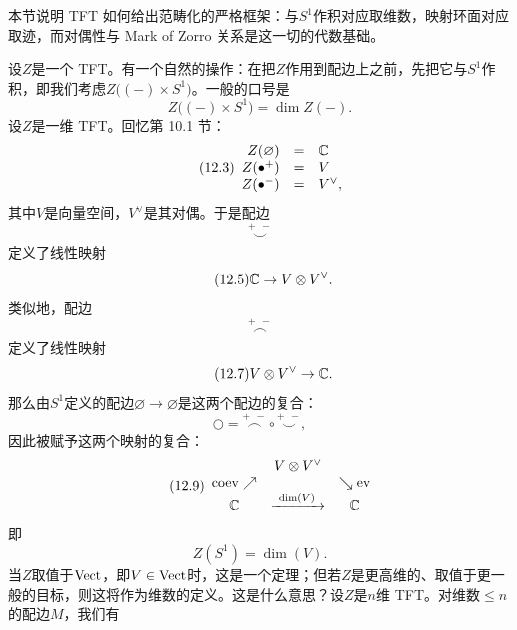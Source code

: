 \begin{sectionkey}
本节说明 TFT 如何给出范畴化的严格框架：与$S^{1}$作积对应取维数，映射环面对应取迹，而对偶性与 Mark of Zorro 关系是这一切的代数基础。
\end{sectionkey}

设$Z$是一个 TFT。有一个自然的操作：在把$Z$作用到配边上之前，先把它与$S^{1}$作积，即我们考虑$Z\bigl((-)\times S^{1}\bigr)$。一般的口号是
\begin{equation}\tag{12.2}
Z\bigl((-)\times S^{1}\bigr)=\dim Z(-).
\end{equation}
设$Z$是一维 TFT。回忆第 10.1 节：
\begin{equation}\tag{12.3}
\begin{array}{rcl}
Z(\varnothing)&=&\mathbb{C}\\
Z(\bullet^+)&=&V\\
Z(\bullet^-)&=&V^{\vee},
\end{array}
\end{equation}
其中$V$是向量空间，$V^{\vee}$是其对偶。于是配边
\begin{equation}\tag{12.4}
\overset{+\ \ -}{\smile}
\end{equation}
定义了线性映射
\begin{equation}\tag{12.5}
\mathbb{C}\to V\otimes V^{\vee}.
\end{equation}
类似地，配边
\begin{equation}\tag{12.6}
\overset{+\ \ -}{\frown}
\end{equation}
定义了线性映射
\begin{equation}\tag{12.7}
V\otimes V^{\vee}\to\mathbb{C}.
\end{equation}
那么由$S^{1}$定义的配边$\varnothing\to\varnothing$是这两个配边的复合：
\begin{equation}\tag{12.8}
\bigcirc=\overset{+\ \ -}{\frown}\circ\overset{+\ \ -}{\smile},
\end{equation}
因此被赋予这两个映射的复合：
\begin{equation}\tag{12.9}
\begin{array}{ccc}
 & V\otimes V^{\vee} & \\
 \mathrm{coev}\nearrow & & \searrow\mathrm{ev}\\
 \mathbb{C} & \xrightarrow{\ \dim(V)\ } & \mathbb{C}
\end{array}
\end{equation}
即
\begin{equation}\tag{12.10}
Z(S^{1})=\dim(V).
\end{equation}
当$Z$取值于$\mathrm{Vect}$，即$V\in\mathrm{Vect}$时，这是一个定理；但若$Z$是更高维的、取值于更一般的目标，则这将作为维数的定义。这是什么意思？设$Z$是$n$维 TFT。对维数$\le n$的配边$M$，我们有
